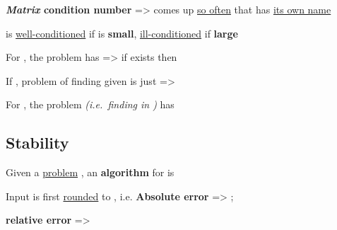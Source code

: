 \textbf{\emph{Matrix} condition number} 
=> comes up \underline{so often} that has \underline{its own name}
\begin{itemize}
      \vItem
             is \underline{well-conditioned} if
             is \textbf{small}, \underline{ill-conditioned} if
            \textbf{large}
      \vItem
\end{itemize}

\hSep %

For , the problem
 has
 => if
 exists then 

\begin{itemize}

      \vItem
            If , problem of finding  given  is
            just  =>
\end{itemize}

For , the problem
 \emph{(i.e.~finding
       in )} has


\subsection*{Stability}

Given a \underline{problem} , an \textbf{algorithm} for
 is 

\begin{itemize}
      \vItem
            Input  is first \underline{rounded} to ,
            i.e. 
      \vItem
            \textbf{Absolute error} => ;

            \textbf{relative error} => 
\end{itemize}

